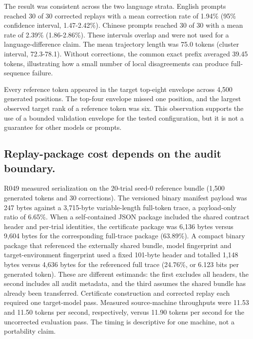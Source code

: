 \documentclass{nature}
\begin{document}
The result was consistent across the two language strata. English prompts reached 30 of 30 corrected replays with a mean correction rate of 1.94\% (95\% confidence interval, 1.47-2.42\%). Chinese prompts reached 30 of 30 with a mean rate of 2.39\% (1.86-2.86\%). These intervals overlap and were not used for a language-difference claim. The mean trajectory length was 75.0 tokens (cluster interval, 72.3-78.1). Without corrections, the common exact prefix averaged 39.45 tokens, illustrating how a small number of local disagreements can produce full-sequence failure.

Every reference token appeared in the target top-eight envelope across 4,500 generated positions. The top-four envelope missed one position, and the largest observed target rank of a reference token was six. This observation supports the use of a bounded validation envelope for the tested configuration, but it is not a guarantee for other models or prompts.

\subsection{Replay-package cost depends on the audit boundary.}
R049 measured serialization on the 20-trial seed-0 reference bundle (1,500 generated tokens and 30 corrections). The versioned binary manifest payload was 247 bytes against a 3,715-byte variable-length full-token trace, a payload-only ratio of 6.65\%. When a self-contained JSON package included the shared contract header and per-trial identities, the certificate package was 6,136 bytes versus 9,604 bytes for the corresponding full-trace package (63.89\%). A compact binary package that referenced the externally shared bundle, model fingerprint and target-environment fingerprint used a fixed 101-byte header and totalled 1,148 bytes versus 4,636 bytes for the referenced full trace (24.76\%, or 6.123 bits per generated token). These are different estimands: the first excludes all headers, the second includes all audit metadata, and the third assumes the shared bundle has already been transferred. Certificate construction and corrected replay each required one target-model pass. Measured source-machine throughputs were 11.53 and 11.50 tokens per second, respectively, versus 11.90 tokens per second for the uncorrected evaluation pass. The timing is descriptive for one machine, not a portability claim.
\end{document}
